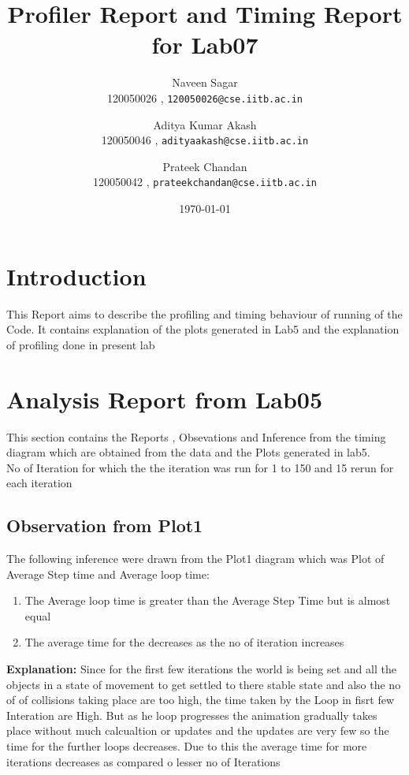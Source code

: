 \documentclass[11pt,]{article}
\begin{document}
\begin{singlespace}
\title{Profiler Report and Timing Report for Lab07}
\author{Naveen Sagar\\120050026 ,
 \texttt{120050026@cse.iitb.ac.in} \\
\and
Aditya Kumar Akash\\120050046 , \texttt{adityaakash@cse.iitb.ac.in} \\ 
\and
Prateek Chandan\\120050042 , \texttt{prateekchandan@cse.iitb.ac.in} \\
}
\date{\today}
\maketitle 
\section{Introduction}
This Report aims to describe the profiling and timing behaviour of running of the Code. It contains explanation of the plots generated in Lab5
 and the explanation of profiling done in present lab
\section{Analysis Report from Lab05}
This section contains the Reports , Obsevations and Inference from the timing diagram which are obtained from the data and the 
Plots generated in lab5.\\
No of Iteration for which the 	the iteration was run for 1 to 150 and 15 rerun for each iteration
\subsection{Observation from Plot1}
The following inference were drawn from the Plot1 diagram which was Plot of Average Step time  and Average loop time:
\begin{enumerate}
    \item The Average loop time is greater than the Average Step Time but is almost equal
    \item The average time for the decreases as the no of iteration increases
\end{enumerate}
\textbf{Explanation:}
Since for the first few iterations the world is being set and all the objects in a state of movement to get settled to there stable state
and also the no of of collisions taking place are too high, the time taken by the Loop in fisrt few Interation are High.
But as he loop progresses the animation gradually takes place without much calcualtion or updates and the updates are very few so the time for 
the further loops decreases. Due to this the average time for more iterations decreases as compared o lesser no of Iterations\\


\end{singlespace}
\end{document}
